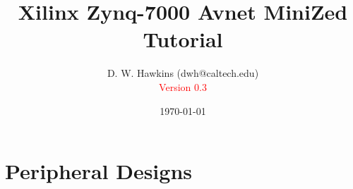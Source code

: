 \documentclass[10pt,twoside]{article}
\begin{document}
\title{Xilinx Zynq-7000 Avnet MiniZed Tutorial}
\author{D. W. Hawkins (dwh@caltech.edu)\\\textcolor{red}{Version 0.3}}
\date{\today}

\maketitle

\tableofcontents

\pagestyle{fancy}

\cleardoublepage

%
%

\clearpage

\clearpage
\clearpage


\clearpage

\clearpage

\clearpage



\clearpage

\clearpage
\section{Peripheral Designs}

\clearpage

\clearpage


\appendix
\clearpage

\clearpage

\clearpage

\clearpage

\clearpage

%
%



\end{document}
